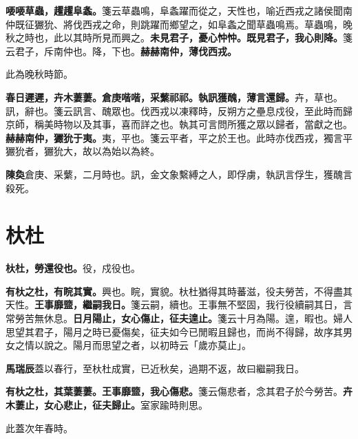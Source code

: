 \textbf{喓喓草蟲，趯趯阜螽。}{\footnotesize 箋云草蟲鳴，阜螽躍而從之，天性也，喻近西戎之諸侯聞南仲既征玁狁、將伐西戎之命，則跳躍而鄉望之，如阜螽之聞草蟲鳴焉。草蟲鳴，晚秋之時也，此以其時所見而興之。}\textbf{未見君子，憂心忡忡。既見君子，我心則降。}{\footnotesize 箋云君子，斥南仲也。降，下也。}\textbf{赫赫南仲，薄伐西戎。}

\begin{quoting}此為晚秋時節。\end{quoting}

\textbf{春日遲遲，卉木萋萋。倉庚喈喈，采蘩祁祁。執訊獲醜，薄言還歸。}{\footnotesize 卉，草也。訊，辭也。箋云訊言、醜眾也。伐西戎以凍釋時，反朔方之壘息戍役，至此時而歸京師，稱美時物以及其事，喜而詳之也。執其可言問所獲之眾以歸者，當獻之也。}\textbf{赫赫南仲，玁狁于夷。}{\footnotesize 夷，平也。箋云平者，平之於王也。此時亦伐西戎，獨言平玁狁者，玁狁大，故以為始以為終。}

\begin{quoting}\textbf{陳奐}倉庚、采蘩，二月時也。訊，金文象繫縛之人，即俘虜，執訊言俘生，獲醜言殺死。\end{quoting}

\section{杕杜}


\textbf{杕杜，勞還役也。}{\footnotesize 役，戍役也。}

\textbf{有杕之杜，有睆其實。}{\footnotesize 興也。睆，實貌。杕杜猶得其時蕃滋，役夫勞苦，不得盡其天性。}\textbf{王事靡盬，繼嗣我日。}{\footnotesize 箋云嗣，續也。王事無不堅固，我行役續嗣其日，言常勞苦無休息。}\textbf{日月陽止，女心傷止，征夫遑止。}{\footnotesize 箋云十月為陽。遑，暇也。婦人思望其君子，陽月之時已憂傷矣，征夫如今已閒暇且歸也，而尚不得歸，故序其男女之情以說之。陽月而思望之者，以初時云「歲亦莫止」。}

\begin{quoting}\textbf{馬瑞辰}蓋以春行，至杕杜成實，已近秋矣，過期不返，故曰繼嗣我日。\end{quoting}

\textbf{有杕之杜，其葉萋萋。王事靡盬，我心傷悲。}{\footnotesize 箋云傷悲者，念其君子於今勞苦。}\textbf{卉木萋止，女心悲止，征夫歸止。}{\footnotesize 室家踰時則思。}

\begin{quoting}此蓋次年春時。\end{quoting}


